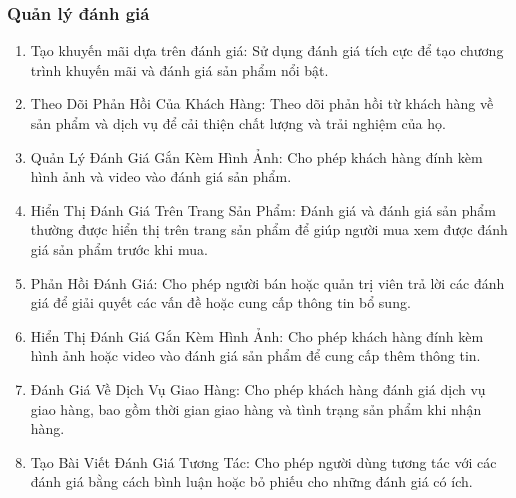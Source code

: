         \subsubsection{Quản lý đánh giá}
        \begin{enumerate}
            \item Tạo khuyến mãi dựa trên đánh giá: Sử dụng đánh giá tích cực để tạo chương trình khuyến mãi và đánh giá sản phẩm nổi bật.
            \item  Theo Dõi Phản Hồi Của Khách Hàng:
        Theo dõi phản hồi từ khách hàng về sản phẩm và dịch vụ để cải thiện chất lượng và trải nghiệm của họ.
            \item Quản Lý Đánh Giá Gắn Kèm Hình Ảnh:
        Cho phép khách hàng đính kèm hình ảnh và video vào đánh giá sản phẩm.
            \item Hiển Thị Đánh Giá Trên Trang Sản Phẩm:
        Đánh giá và đánh giá sản phẩm thường được hiển thị trên trang sản phẩm để giúp người mua xem được đánh giá sản phẩm trước khi mua.
            \item Phản Hồi Đánh Giá:
        Cho phép người bán hoặc quản trị viên trả lời các đánh giá để giải quyết các vấn đề hoặc cung cấp thông tin bổ sung.
            \item Hiển Thị Đánh Giá Gắn Kèm Hình Ảnh:
        Cho phép khách hàng đính kèm hình ảnh hoặc video vào đánh giá sản phẩm để cung cấp thêm thông tin.
            \item Đánh Giá Về Dịch Vụ Giao Hàng:
        Cho phép khách hàng đánh giá dịch vụ giao hàng, bao gồm thời gian giao hàng và tình trạng sản phẩm khi nhận hàng.
            \item Tạo Bài Viết Đánh Giá Tương Tác:
        Cho phép người dùng tương tác với các đánh giá bằng cách bình luận hoặc bỏ phiếu cho những đánh giá có ích.
        \end{enumerate}
